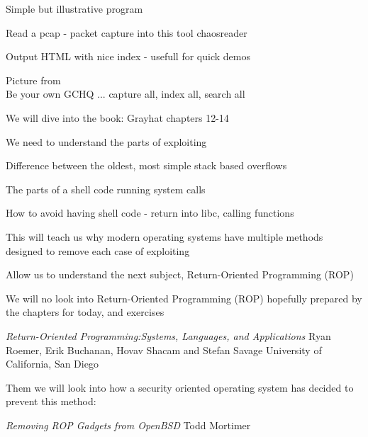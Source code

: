 \documentclass[Screen16to9,17pt]{foils}
\begin{document}
\begin{list1}
\item Simple but illustrative program
\item Read a pcap - packet capture into this tool chaosreader
\item Output HTML with nice index - usefull for quick demos
\item {}

\end{list1}



Picture from \\
Be your own GCHQ ... capture all, index all, search all









\begin{list1}
\item We will dive into the book: Grayhat chapters 12-14
\item We need to understand the parts of exploiting
\item Difference between the oldest, most simple stack based overflows
\item The parts of a shell code running system calls
\item How to avoid having shell code - return into libc, calling functions
\item This will teach us why modern operating systems have multiple methods designed to remove each case of exploiting
\item Allow us to understand the next subject, Return-Oriented Programming (ROP)
\end{list1}



\begin{list1}
\item We will no look into Return-Oriented Programming (ROP) hopefully prepared by the chapters for today, and exercises
\item \emph{Return-Oriented Programming:Systems, Languages, and Applications}
Ryan Roemer, Erik Buchanan, Hovav Shacam and Stefan Savage University of California, San Diego\\
\item Them we will look into how a security oriented operating system has decided to prevent this method:
\item \emph{Removing ROP Gadgets from OpenBSD}
Todd Mortimer\\
\end{list1}
\end{document}
